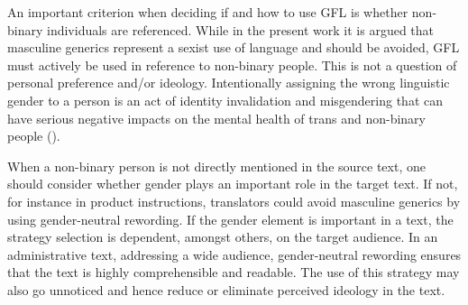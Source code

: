 \begin{figure}
%
\end{figure}


An important criterion when deciding if and how to use GFL is whether non-binary individuals are referenced. While in the present work it is argued that masculine generics represent a sexist use of language and should be avoided, GFL must actively be used in reference to non-binary people. This is not a question of personal preference and/or ideology. Intentionally assigning the wrong linguistic gender to a person is an act of identity invalidation and misgendering that can have serious negative impacts on the mental health of trans and non-binary people (\cite{mclemore2018minority}). 

When a non-binary person is not directly mentioned in the source text, one should consider whether gender plays an important role in the target text. If not, for instance in product instructions, translators could avoid masculine generics by using gender-neutral rewording. If the gender element is important in a text, the strategy selection is dependent, amongst others, on the target audience. In an administrative text, addressing a wide audience, gender-neutral rewording ensures that the text is highly comprehensible and readable. The use of this strategy may also go unnoticed and hence reduce or eliminate perceived ideology in the text.

